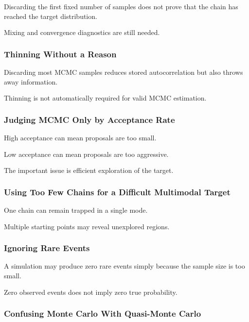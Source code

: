 Discarding the first fixed number of samples does not prove that the chain
has reached the target distribution.

Mixing and convergence diagnostics are still needed.

\subsubsection{Thinning Without a Reason}

Discarding most MCMC samples reduces stored autocorrelation but also throws
away information.

Thinning is not automatically required for valid MCMC estimation.

\subsubsection{Judging MCMC Only by Acceptance Rate}

High acceptance can mean proposals are too small.

Low acceptance can mean proposals are too aggressive.

The important issue is efficient exploration of the target.

\subsubsection{Using Too Few Chains for a Difficult Multimodal Target}

One chain can remain trapped in a single mode.

Multiple starting points may reveal unexplored regions.

\subsubsection{Ignoring Rare Events}

A simulation may produce zero rare events simply because the sample size is
too small.

Zero observed events does not imply zero true probability.

\subsubsection{Confusing Monte Carlo With Quasi-Monte Carlo}

